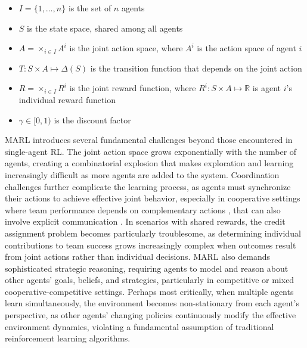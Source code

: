 \begin{itemize}
    \item $I = \{1, \ldots, n\}$ is the set of $n$ agents
    \item $S$ is the state space, shared among all agents
    \item $A = \times_{i \in I} A^i$ is the joint action space, where $A^i$ is the action space of agent $i$
    \item $T: S \times A \mapsto \Delta(S)$ is the transition function that depends on the joint action
    \item $R = \times_{i \in I} R^i$ is the joint reward function, where $R^i: S \times A \mapsto \mathbb{R}$ is agent $i$'s individual reward function
    \item $\gamma \in [0, 1)$ is the discount factor
\end{itemize}
MARL introduces several fundamental challenges beyond those encountered in single-agent RL. The joint action space grows exponentially with the number of agents, creating a combinatorial explosion that makes exploration and learning increasingly difficult as more agents are added to the system. Coordination challenges further complicate the learning process, as agents must synchronize their actions to achieve effective joint behavior, especially in cooperative settings where team performance depends on complementary actions \cite{du2023reviewcooperationmultiagentlearning}, that can also involve explicit communication \cite{zhu2024surveymultiagentdeepreinforcement}. In scenarios with shared rewards, the credit assignment problem becomes particularly troublesome, as determining individual contributions to team success grows increasingly complex when outcomes result from joint actions rather than individual decisions. MARL also demands sophisticated strategic reasoning, requiring agents to model and reason about other agents' goals, beliefs, and strategies, particularly in competitive or mixed cooperative-competitive settings. Perhaps most critically, when multiple agents learn simultaneously, the environment becomes non-stationary from each agent's perspective, as other agents' changing policies continuously modify the effective environment dynamics, violating a fundamental assumption of traditional reinforcement learning algorithms.

